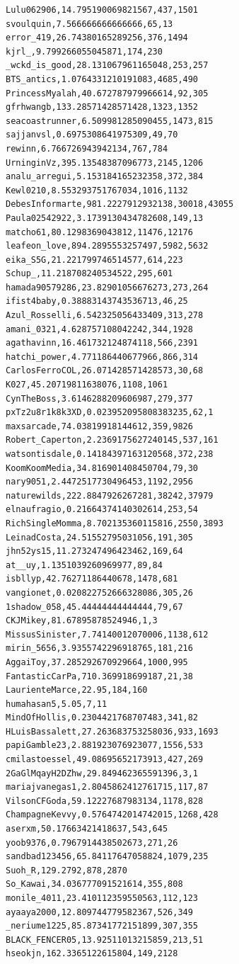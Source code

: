 \begin{verbatim}
Lulu062906,14.795190069821567,437,1501
svoulquin,7.566666666666666,65,13
error_419,26.74380165289256,376,1494
kjrl_,9.799266055045871,174,230
_wckd_is_good,28.131067961165048,253,257
BTS_antics,1.0764331210191083,4685,490
PrincessMyalah,40.672787979966614,92,305
gfrhwangb,133.28571428571428,1323,1352
seacoastrunner,6.509981285090455,1473,815
sajjanvsl,0.6975308641975309,49,70
rewinn,6.766726943942134,767,784
UrninginVz,395.13548387096773,2145,1206
analu_arregui,5.153184165232358,372,384
Kewl0210,8.553293751767034,1016,1132
DebesInformarte,981.2227912932138,30018,43055
Paula02542922,3.1739130434782608,149,13
matcho61,80.1298369043812,11476,12176
leafeon_love,894.2895553257497,5982,5632
eika_S5G,21.221799746514577,614,223
Schup_,11.218708240534522,295,601
hamada90579286,23.82901056676273,273,264
ifist4baby,0.38883143743536713,46,25
Azul_Rosselli,6.542325056433409,313,278
amani_0321,4.628757108042242,344,1928
agathavinn,16.461732124874118,566,2391
hatchi_power,4.771186440677966,866,314
CarlosFerroCOL,26.071428571428573,30,68
K027,45.20719811638076,1108,1061
CynTheBoss,3.6146288209606987,279,377
pxTz2u8r1k8k3XD,0.023952095808383235,62,1
maxsarcade,74.03819918144612,359,9826
Robert_Caperton,2.2369175627240145,537,161
watsontisdale,0.14184397163120568,372,238
KoomKoomMedia,34.816901408450704,79,30
nary9051,2.4472517730496453,1192,2956
naturewilds,222.8847926267281,38242,37979
elnaufragio,0.21664374140302614,253,54
RichSingleMomma,8.702135360115816,2550,3893
LeinadCosta,24.51552795031056,191,305
jhn52ys15,11.273247496423462,169,64
at__uy,1.1351039260969977,89,84
isbllyp,42.76271186440678,1478,681
vangionet,0.020822752666328086,305,26
1shadow_058,45.44444444444444,79,67
CKJMikey,81.67895878524946,1,3
MissusSinister,7.74140012070006,1138,612
mirin_5656,3.9355742296918765,181,216
AggaiToy,37.285292670929664,1000,995
FantasticCarPa,710.369918699187,21,38
LaurienteMarce,22.95,184,160
humahasan5,5.05,7,11
MindOfHollis,0.2304421768707483,341,82
HLuisBassalett,27.263683753258036,933,1693
papiGamble23,2.881923076923077,1556,533
cmilastoessel,49.08695652173913,427,269
2GaGlMqayH2DZhw,29.849462365591396,3,1
mariajvanegas1,2.8045862412761715,117,87
VilsonCFGoda,59.12227687983134,1178,828
ChampagneKevvy,0.5764742014742015,1268,428
aserxm,50.17663421418637,543,645
yoob9376,0.7967914438502673,271,26
sandbad123456,65.84117647058824,1079,235
Suoh_R,129.2792,878,2870
So_Kawai,34.036777091521614,355,808
monile_4011,23.410112359550563,112,123
ayaaya2000,12.809744779582367,526,349
_neriume1225,85.87341772151899,307,355
BLACK_FENCER05,13.92511013215859,213,51
hseokjn,162.3365122615804,149,2128

\end{verbatim}
